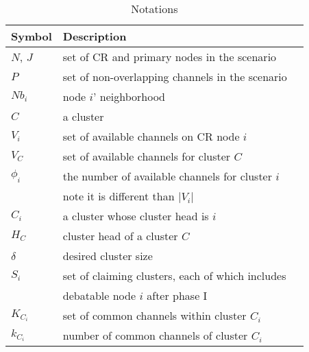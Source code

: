 \begin{table}[ht!]
\caption{Notations}\label{tab1}
\centering
\begin{tabular}{llr}
\toprule
Symbol & Description \\
\midrule
$N$, $J$ & set of CR and primary nodes in the scenario\\
$P$ & set of non-overlapping channels in the scenario\\
$Nb_i$ & node $i$' neighborhood     \\
$C$ & a cluster \\
$V_i$   & set of available channels on CR node $i$  \\
$V_C$   & set of available channels for cluster $C$  \\
$\phi_i$ & the number of available channels for cluster $i$\\
		& note it is different than $|V_i|$\\
$C_i$ & a cluster whose cluster head is $i$ \\
$H_C$ & cluster head of a cluster $C$\\
$\delta$ & desired cluster size\\
$S_i$ & set of claiming clusters, each of which includes \\
& debatable node $i$ after phase I\\
$K_{C_i}$ & set of common channels within cluster $C_i$\\
$k_{C_i}$ & number of common channels of cluster $C_i$\\
\bottomrule
\end{tabular}
\end{table}





